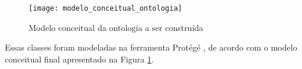       \begin{figure}[!htb]
	\centering
	\texttt{[image: modelo\_conceitual\_ontologia]}
	\caption[Modelo conceitual da ontologia]{Modelo conceitual da ontologia a ser construída}
	\label{fig:modelo_conceitual_ontologia}
      \end{figure}
      
      Essas classes foram modeladas na ferramenta Protégé \footnotemark[2], de acordo com o modelo conceitual final
      apresentado na Figura \ref{fig:modelo_conceitual_ontologia}.

	

      
      
    
    
      
  

  